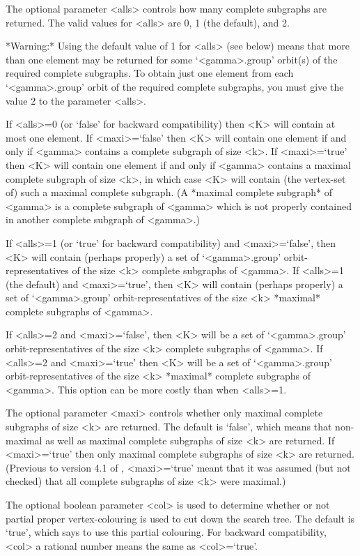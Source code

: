 The optional parameter <alls> controls how many complete subgraphs are
returned. The valid values for <alls> are 0, 1 (the default), and 2.

*Warning:* Using the default value of 1 for <alls> (see below) means that
more than one element may be returned for some `<gamma>.group' orbit(s)
of the required complete subgraphs.  To obtain just one element from each
`<gamma>.group' orbit of the required complete subgraphs, you must give
the value 2 to the parameter <alls>.

If <alls>=0 (or `false' for backward compatibility) then <K> will
contain at most one element.  If <maxi>=`false' then <K> will contain one
element if and only if <gamma> contains a complete subgraph of size <k>.
If <maxi>=`true' then <K> will contain one element if and only if <gamma>
contains a maximal complete subgraph of size <k>, in which case <K>
will contain (the vertex-set of) such a maximal complete subgraph.
(A *maximal complete subgraph* of <gamma> is a complete subgraph of
<gamma> which is not properly contained in another complete subgraph
of <gamma>.)

If <alls>=1 (or `true' for backward compatibility) and <maxi>=`false',
then <K> will contain (perhaps properly) a set of `<gamma>.group'
orbit-representatives of the size <k> complete subgraphs of <gamma>.
If <alls>=1 (the default) and <maxi>=`true', then <K> will contain
(perhaps properly) a set of `<gamma>.group' orbit-representatives of
the size <k> *maximal* complete subgraphs of <gamma>.

If <alls>=2 and <maxi>=`false', then <K> will be a set of `<gamma>.group'
orbit-representatives of the size <k> complete subgraphs of <gamma>.
If <alls>=2 and <maxi>=`true' then <K> will be a set of `<gamma>.group'
orbit-representatives of the size <k> *maximal* complete subgraphs
of <gamma>.  This option can be more costly than when <alls>=1.

The optional parameter <maxi> controls whether only maximal complete
subgraphs of size <k> are returned.  The default is `false', which means
that non-maximal as well as maximal complete subgraphs of size <k> are
returned. If <maxi>=`true' then only maximal complete subgraphs of size
<k> are returned. (Previous to version 4.1 of {\GRAPE}, <maxi>=`true'
meant that it was assumed (but not checked) that all complete subgraphs
of size <k> were maximal.)

The optional boolean parameter <col> is used to determine whether or not
partial proper vertex-colouring is used to cut down the search tree. The
default is `true', which says to use this partial colouring.  For backward
compatibility, <col> a rational number means the same as <col>=`true'.

